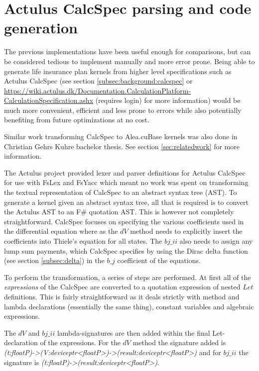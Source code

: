 \section{Actulus CalcSpec parsing and code generation}
The previous implementations have been useful enough for comparisons, but can be considered tedious to implement manually and more error prone.
Being able to generate life insurance plan kernels from higher level specifications such as Actulus CalcSpec (see section \ref{subsec:background:calcspec} or \url{https://wiki.actulus.dk/Documentation.CalculationPlatform-CalculationSpecification.ashx} (requires login) for more information) would be much more convenient, efficient and less prone to errors while also potentially benefiting from future optimizations at no cost.

Similar work transforming CalcSpec to Alea.cuBase kernels was also done in Christian Gehrs Kuhre bachelor thesis.
See section \ref{sec:relatedwork} for more information.

The Actulus project provided lexer and parser definitions for Actulus CalcSpec for use with FsLex and FsYacc\cite{fslexfsyacc} which meant no work was spent on transforming the textual representation of CalcSpec to an abstract syntax tree (AST).
To generate a kernel given an abstract syntax tree, all that is required is to convert the Actulus AST to an F\# quotation AST.
This is however not completely straightforward.
CalcSpec focuses on specifying the various coefficients used in the differential equation where as the $dV$ method needs to explicitly insert the coefficients into Thiele's equation for all states. 
The $bj\_ii$ also needs to assign any lump sum payments, which CalcSpec specifies by using the Dirac delta function (see section \ref{subsec:delta}) in the $b\_j$ coefficient of the equations.

To perform the transformation, a series of steps are performed.
At first all of the \emph{expressions} of the CalcSpec are converted to a quotation expression of nested $Let$ definitions.
This is fairly straightforward as it deals strictly with method and lambda declarations (essentially the same thing), constant variables and algebraic expressions.


The $dV$ and $bj\_ii$ lambda-signatures are then added within the final Let-declaration of the expressions.
For the $dV$ method the signature added is \textit{(t:floatP)-\textgreater{}(V:deviceptr\textless{}floatP\textgreater{})-\textgreater{}(result:deviceptr\textless{}floatP\textgreater{})} and for $bj\_ii$ the signature is \textit{(t:floatP)-\textgreater{}(result:deviceptr\textless{}floatP\textgreater{})}.

